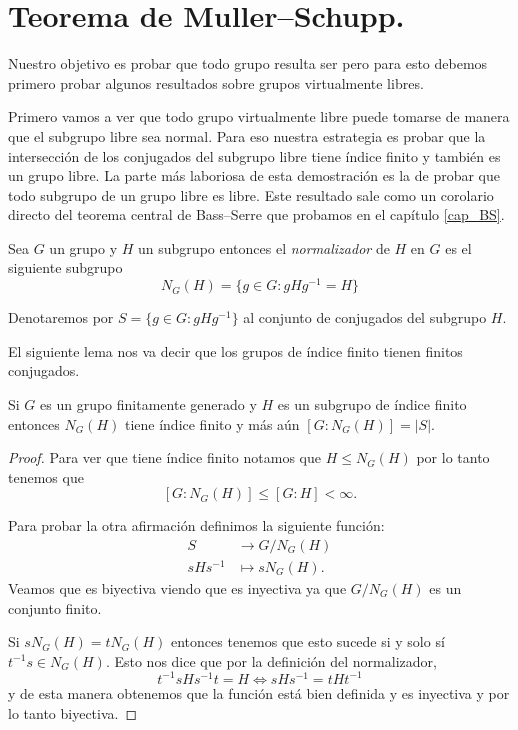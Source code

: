 \documentclass[tesis.tex]{subfiles}
\begin{document}
\section{Teorema de Muller--Schupp.}\label{secc_teo_MS}

Nuestro objetivo es probar que todo grupo \vl resulta ser \ic pero para esto debemos primero probar algunos resultados sobre grupos virtualmente libres.

Primero vamos a ver que todo grupo virtualmente libre puede tomarse de manera que el subgrupo libre sea normal.
Para eso nuestra estrategia es probar que la intersección de los conjugados del subgrupo libre tiene índice finito y también es un grupo libre. 
La parte más laboriosa de esta demostración es la de probar que todo subgrupo de un grupo libre es libre.
Este resultado sale como un corolario directo del teorema central de Bass--Serre que probamos en el capítulo \ref{cap_BS}.
\begin{deff}
	Sea $G$ un grupo y $H$ un subgrupo entonces el \emph{normalizador} de $H$ en $G$ es el siguiente subgrupo
	\begin{equation*}
		N_G(H) = \{ g\in G : gHg^{-1} = H  \}
	\end{equation*}
\end{deff}

Denotaremos por $S= \{ g \in G :  gHg^{-1} \}$ al conjunto de conjugados del subgrupo $H$. 

El siguiente lema nos va decir que los grupos de índice finito tienen finitos conjugados.

\begin{lema}\label{lema_normalizador_conjugados}
	Si $G$ es un grupo finitamente generado y $H$ es un subgrupo de índice finito entonces $N_G(H)$ tiene índice finito y más aún $[G:N_G(H)] = |S|$.
\end{lema}
\begin{proof}
	Para ver que tiene índice finito notamos que $H \le N_G(H)$ por lo tanto tenemos que 
	\[
	[G:N_G(H)] \le [G:H] < \infty.
	\]
	
	Para probar la otra afirmación definimos la siguiente función:
	\begin{align*}
		S  &\to  G/N_G(H)  \\
		sHs^{-1} &\mapsto sN_G(H).
	\end{align*}
	Veamos que es biyectiva viendo que es inyectiva ya que $G/N_{G}(H)$ es un conjunto finito.
	
	Si $sN_G(H) = tN_G(H)$ entonces tenemos que esto sucede si y solo sí $t^{-1}s \in N_G(H)$.
	Esto nos dice que por la definición del normalizador,
	\[
	t^{-1}s H s^{-1}t = H \iff sHs^{-1} = tHt^{-1}
	\]
	y de esta manera obtenemos que la función está bien definida y es inyectiva y por lo tanto biyectiva.
	
\end{proof}
\end{document}
